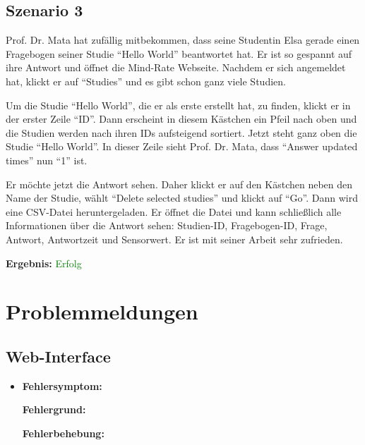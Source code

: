 \documentclass[a4paper]{scrreprt}
\begin{document}
            \section{Szenario 3}
                \par Prof. Dr. Mata hat zuf\"allig mitbekommen, dass seine Studentin Elsa gerade einen Fragebogen seiner Studie ``Hello World'' beantwortet hat. Er ist so gespannt auf ihre Antwort und \"offnet die Mind-Rate Webseite. Nachdem er sich angemeldet hat, klickt er auf ``Studies'' und es gibt schon ganz viele Studien. 
                
                \par Um die Studie ``Hello World'', die er als erste erstellt hat, zu finden, klickt er in der erster Zeile ``ID''. Dann erscheint in diesem K\"astchen ein Pfeil nach oben und die Studien werden nach ihren IDs aufsteigend sortiert. Jetzt steht ganz oben die Studie ``Hello World''. In dieser Zeile sieht Prof. Dr. Mata, dass ``Answer updated times'' nun ``1'' ist.

				\par Er m\"ochte jetzt die Antwort sehen. Daher klickt er auf den K\"astchen neben den Name der Studie, w\"ahlt ``Delete selected studies'' und klickt auf ``Go''. Dann wird eine CSV-Datei heruntergeladen. Er \"offnet die Datei und kann schließlich alle Informationen \"uber die Antwort sehen: Studien-ID, Fragebogen-ID, Frage, Antwort, Antwortzeit und Sensorwert. Er ist mit seiner Arbeit sehr zufrieden.
		      		           \vspace*{0.3cm}
		      		           \par \textbf{Ergebnis: }\textcolor{green}{Erfolg}
		      		           \vspace*{0.6cm}  	


      \newpage
      \chapter{Problemmeldungen}
	      \section{Web-Interface}
		
		     \begin{itemize}
		     \item \textbf{Fehlersymptom:}
		     \par \textbf{Fehlergrund:}
		     \par \textbf{Fehlerbehebung:}
		     \end{itemize}
		
\end{document}
